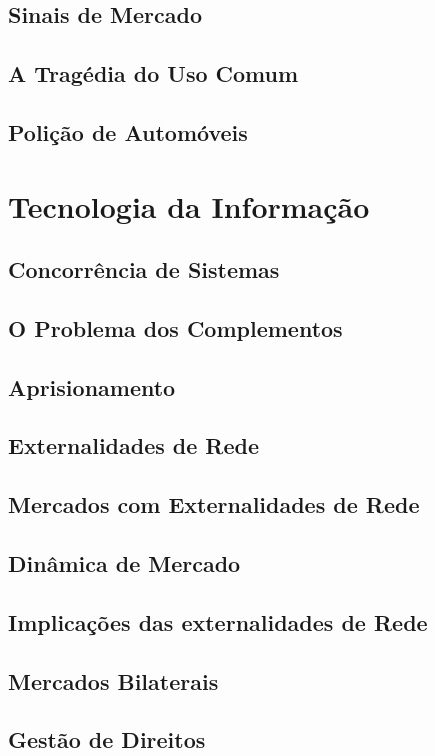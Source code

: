\documentclass[a4paper,11pt,oneside]{book}
\theoremstyle{definition}
\theoremstyle{break}
\begin{document}
\section{Sinais de Mercado}
\section{A Tragédia do Uso Comum}
\section{Polição de Automóveis}

\chapter{Tecnologia da Informação}

\section{Concorrência de Sistemas}
\section{O Problema dos Complementos}
\section{Aprisionamento}
\section{Externalidades de Rede}
\section{Mercados com Externalidades de Rede}
\section{Dinâmica de Mercado}
\section{Implicações das externalidades de Rede}
\section{Mercados Bilaterais}
\section{Gestão de Direitos}
\end{document}
